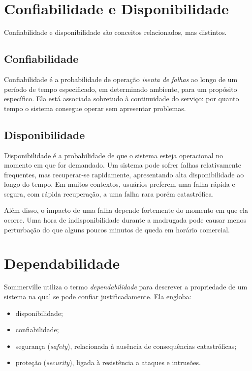 \documentclass[12pt,a4paper]{report}
\begin{document}
\section{Confiabilidade e Disponibilidade}

Confiabilidade e disponibilidade são conceitos relacionados, mas distintos.

\subsection{Confiabilidade}

Confiabilidade é a probabilidade de operação \emph{isenta de falhas} ao
longo de um período de tempo especificado, em determinado ambiente, para um
propósito específico. Ela está associada sobretudo à continuidade do
serviço: por quanto tempo o sistema consegue operar sem apresentar
problemas.

\subsection{Disponibilidade}

Disponibilidade é a probabilidade de que o sistema esteja operacional no
momento em que for demandado. Um sistema pode sofrer falhas relativamente
frequentes, mas recuperar-se rapidamente, apresentando alta disponibilidade
ao longo do tempo. Em muitos contextos, usuários preferem uma falha rápida e
segura, com rápida recuperação, a uma falha rara porém catastrófica.

Além disso, o impacto de uma falha depende fortemente do momento em que ela
ocorre. Uma hora de indisponibilidade durante a madrugada pode causar menos
perturbação do que alguns poucos minutos de queda em horário comercial.

\section{Dependabilidade}

Sommerville utiliza o termo \emph{dependabilidade} para descrever a
propriedade de um sistema na qual se pode confiar justificadamente. Ela
engloba:
\begin{itemize}[nosep]
    \item disponibilidade;
    \item confiabilidade;
    \item segurança (\emph{safety}), relacionada à ausência de consequências
    catastróficas;
    \item proteção (\emph{security}), ligada à resistência a ataques e
    intrusões.
\end{itemize}
\end{document}
